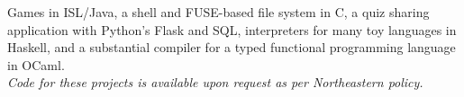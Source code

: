 \documentclass[letterpaper]{resume} %
\begin{document}
\begin{minipage}[t]{0.66\textwidth}
Games in ISL/Java,
a shell and FUSE-based file system in C,
a quiz sharing application with Python's Flask and SQL,
interpreters for many toy languages in Haskell,
and a substantial compiler for a typed functional programming language in OCaml. \\
\textit{Code for these projects is available upon request as per Northeastern policy.}

\end{minipage} %
\end{document}
